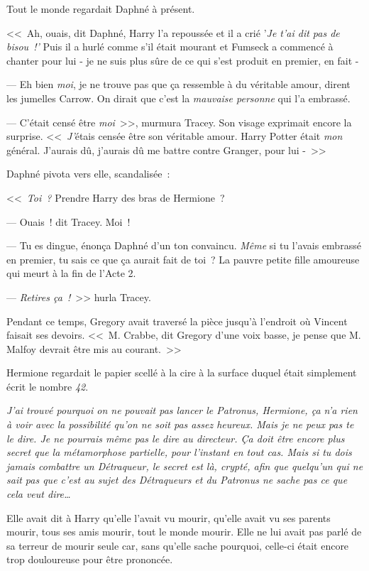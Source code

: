 Tout le monde regardait Daphné à présent.

<<~Ah, ouais, dit Daphné, Harry l'a repoussée et il a crié '\emph{Je t'ai dit pas de bisou~!'} Puis il a hurlé comme s'il était mourant et Fumseck a commencé à chanter pour lui - je ne suis plus sûre de ce qui s'est produit en premier, en fait -

--- Eh bien \emph{moi}, je ne trouve pas que ça ressemble à du véritable amour, dirent les jumelles Carrow. On dirait que c'est la \emph{mauvaise personne} qui l'a embrassé.

--- C'était censé être \emph{moi}~>>, murmura Tracey. Son visage exprimait encore la surprise. <<~\emph{J'}étais censée être son véritable amour. Harry Potter était \emph{mon} général. J'aurais dû, j'aurais dû me battre contre Granger, pour lui -~>>

Daphné pivota vers elle, scandalisée~:

<<~\emph{Toi~?} Prendre Harry des bras de Hermione~?

--- Ouais~! dit Tracey. Moi~!

--- Tu es dingue, énonça Daphné d'un ton convaincu. \emph{Même} si tu l'avais embrassé en premier, tu sais ce que ça aurait fait de toi~? La pauvre petite fille amoureuse qui meurt à la fin de l'Acte 2.

--- \emph{Retires ça~!}~>> hurla Tracey.

Pendant ce temps, Gregory avait traversé la pièce jusqu'à l'endroit où Vincent faisait ses devoirs. <<~M. Crabbe, dit Gregory d'une voix basse, je pense que M. Malfoy devrait être mis au courant.~>>


Hermione regardait le papier scellé à la cire à la surface duquel était simplement écrit le nombre \emph{42}.

\emph{J'ai trouvé pourquoi on ne pouvait pas lancer le Patronus, Hermione, ça n'a rien à voir avec la possibilité qu'on ne soit pas assez heureux. Mais je ne peux pas te le dire. Je ne pourrais même pas le dire au directeur. Ça doit être encore plus secret que la métamorphose partielle, pour l'instant en tout cas. Mais si tu dois jamais combattre un Détraqueur, le secret est là, crypté, afin que quelqu'un qui ne sait pas que c'est au sujet des Détraqueurs et du Patronus ne sache pas ce que cela veut dire…}

Elle avait dit à Harry qu'elle l'avait vu mourir, qu'elle avait vu ses parents mourir, tous ses amis mourir, tout le monde mourir. Elle ne lui avait pas parlé de sa terreur de mourir seule car, sans qu'elle sache pourquoi, celle-ci était encore trop douloureuse pour être prononcée.

